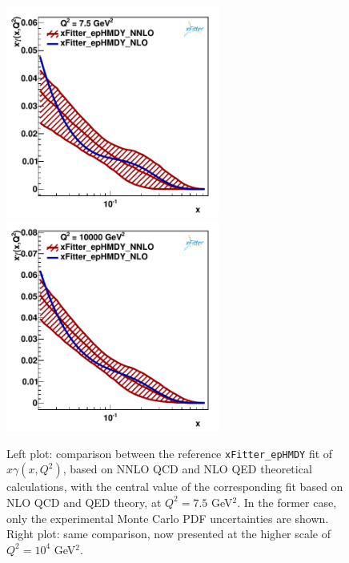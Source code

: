 \begin{figure}[t]
\centering
\includegraphics[width=7cm]{figs/q2_7_5_pdf_ph_NLOvsNNLO.pdf}
\includegraphics[width=7cm]{figs/q2_10000_pdf_ph_NLOvsNNLO.pdf}
\caption{Left plot: comparison between the reference {\tt xFitter\_epHMDY}
  fit of $x\gamma(x,Q^2)$, based on  NNLO QCD and NLO QED theoretical
  calculations, with the central value of the corresponding fit based
  on NLO QCD and QED theory, at $Q^2=7.5$ GeV$^2$.
  In the former case, only the experimental Monte Carlo PDF
  uncertainties are shown.
  Right plot: same comparison, now presented at the higher scale of $Q^2=10^4$ GeV$^2$.  }
\label{fig:nlo_vs_nnlo}
\end{figure}
